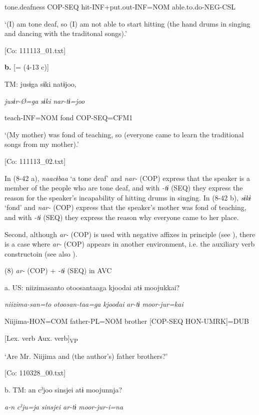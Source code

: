       tone.deafness  COP-SEQ  hit-INF+put.out-INF=NOM  able.to.do-NEG-CSL

      ‘(I) am tone deaf, so (I) am not able to start hitting (the hand drums in singing and dancing with the traditonal songs).’

      [Co: 111113\_01.txt]

  \textbf{b.}  [= (4-13 c)]

    TM:  jusɨga  sɨki  natɨjoo,

      \textit{jusɨr-Ø=ga}  \textit{sɨki}  \textit{nar-tɨ=joo}

      teach-INF=NOM  fond  COP-SEQ=CFM1

      ‘(My mother) was fond of teaching, so (everyone came to learn the traditional songs from my mother).’

      [Co: 111113\_02.txt]

In (8-42 a), \textit{naacɨbaa} ‘a tone deaf’ and \textit{nar-} (COP) express that the speaker is a member of the people who are tone deaf, and with \textit{{}-tɨ} (SEQ) they express the reason for the speaker’s incapability of hitting drums in singing. In (8-42 b), \textit{sɨkɨ} ‘fond’ and \textit{nar-} (COP) express that the speaker’s mother was fond of teaching, and with \textit{{}-tɨ} (SEQ) they express the reason why everyone came to her place.

  Second, although \textit{ar-} (COP) is used with negative affixes in principle (see ), there is a case where \textit{ar-} (COP) appears in another environment, i.e. the auxiliary verb constructoin (see also ).

(8)  \textit{ar-} (COP) + \textit{{}-tɨ} (SEQ) in AVC

  a.  US:  {\textbar}niizimasanto  otoosan{\textbar}taaga  {\textbar}kjoodai{\textbar}  atɨ  moojukkai?

      \textit{niizima-san=to}  \textit{otoosan-taa=ga}  \textit{kjoodai}  \textit{ar-tɨ}  \textit{moor-jur=kai}

      Niijima{}-HON=COM  father{}-PL=NOM  brother  [COP-SEQ  HON-UMRK]=DUB

            [Lex. verb  Aux. verb]\textsubscript{VP}

      ‘Are Mr. Niijima and (the author’s) father brothers?’

      [Co: 110328\_00.txt]

  b.  TM:  an  cˀjoo  sinsjei  atɨ  moojunnja?

      \textit{a-n}  \textit{cˀju=ja}  \textit{sinsjei}  \textit{ar-tɨ}  \textit{moor-jur-i=na}

